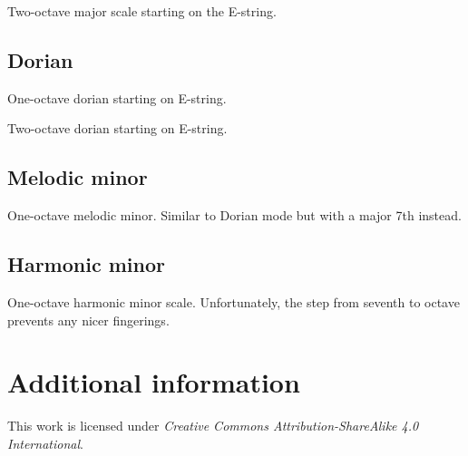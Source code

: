 \documentclass[a4paper, parskip=half]{scrartcl}
\newcommand{\addfingering}[2][10]{%
  \def\data{#2}
  \def\nfrets{#1}
  \pgfmathsetmacro\nfretsm{1+\nfrets}
  \foreach \x in {1, ..., \nfrets}
    \draw[fret] (\x, 0) -- (\x, 1.95);

  \foreach \y in {0, 0.65, 1.3, 1.95}
    \draw[string] (0, \y) -- (\nfretsm, \y);

  \foreach \x / \y / \z [count=\ni]  in \data{%
    \pgfmathsetmacro\yr{0.65*\y}
    \node[fretted] (fretted-\ni) at (\x, \yr) {\z};
  }
}
\begin{document}
Two-octave major scale starting on the E-string.
\vspace{1em}



\subsection{Dorian}

One-octave dorian starting on E-string.


Two-octave dorian starting on E-string.


\subsection{Melodic minor}

One-octave melodic minor. Similar to Dorian mode but with a major 7th instead.



\subsection{Harmonic minor}

One-octave harmonic minor scale. Unfortunately, the step from seventh to octave
prevents any nicer fingerings.
\vspace{1em}



\section{Additional information}

This work is licensed under \emph{Creative Commons Attribution-ShareAlike 4.0
International}.

\begin{center}\ccbysa\end{center}
\end{document}
